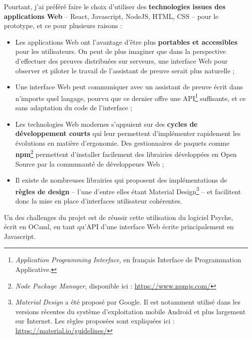 Pourtant, j'ai préféré faire le choix d'utiliser des \textbf{technologies issues des applications Web} -- React, Javascript, NodeJS, HTML, CSS -- pour le prototype, et ce pour plusieurs raisons :
\begin{itemize}
\item Les applications Web ont l'avantage d'être plus \textbf{portables et accessibles} pour les utilisateurs. On peut de plus imaginer que dans la perspective d'effectuer des preuves distribuées sur serveurs, une interface Web pour observer et piloter le travail de l'assistant de preuve serait plus naturelle ;
\item Une interface Web peut communiquer avec un assistant de preuve écrit dans n'importe quel langage, pourvu que ce dernier offre une API\footnote{\textit{Application Programming Interface}, en français Interface de Programmation Applicative.} suffisante, et ce sans adaptation du code de l'interface ;
\item Les technologies Web modernes s'appuient sur des \textbf{cycles de développement courts} qui leur permettent d'implémenter rapidement les évolutions en matière d'ergonomie. Des gestionnaires de paquets comme \textbf{npm}\footnote{\textit{Node Package Manager}, disponible ici : \url{https://www.npmjs.com/}} permettent d'installer facilement des librairies développées en Open Source par la communauté de développeurs Web ;
\item Il existe de nombreuses librairies qui proposent des implémentations de \textbf{règles de design} -- l'une d'entre elles étant Material Design\footnote{\textit{Material Design} a été proposé par Google. Il est notamment utilisé dans les versions récentes du système d'exploitation mobile Android et plus largement sur Internet. Les règles proposées sont expliquées ici : \url{https://material.io/guidelines/}} -- et facilitent donc la mise en place d'interfaces utilisateur cohérentes.
\end{itemize}

Un des challenges du projet est de réussir cette utilisation du logiciel Psyche, écrit en OCaml, en tant qu'API d'une interface Web écrite principalement en Javascript.